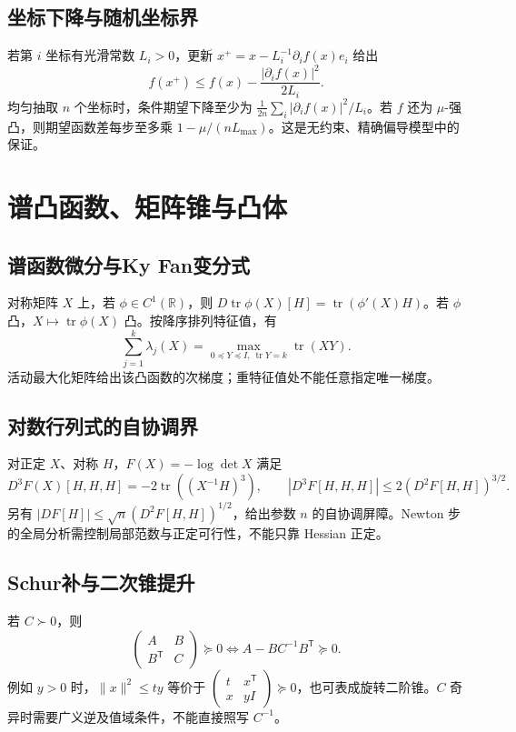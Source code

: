 \documentclass[../main.tex]{subfiles}
\begin{document}
\subsection{坐标下降与随机坐标界}
若第 $i$ 坐标有光滑常数 $L_i>0$，更新 $x^+=x-L_i^{-1}\partial_if(x)e_i$ 给出
\[
f(x^+)\le f(x)-\frac{|\partial_if(x)|^2}{2L_i}.
\]
均匀抽取 $n$ 个坐标时，条件期望下降至少为 $\frac1{2n}\sum_i|\partial_if(x)|^2/L_i$。若 $f$ 还为 $\mu$-强凸，则期望函数差每步至多乘 $1-\mu/(nL_{\max})$。这是无约束、精确偏导模型中的保证。
\section{谱凸函数、矩阵锥与凸体}
\subsection{谱函数微分与Ky Fan变分式}
对称矩阵 $X$ 上，若 $\phi\in C^1(\mathbb R)$，则 $D\operatorname{tr}\phi(X)[H]=\operatorname{tr}(\phi'(X)H)$。若 $\phi$ 凸，$X\mapsto\operatorname{tr}\phi(X)$ 凸。按降序排列特征值，有
\[
\sum_{j=1}^k\lambda_j(X)=\max_{0\preceq Y\preceq I,\ \operatorname{tr}Y=k}\operatorname{tr}(XY).
\]
活动最大化矩阵给出该凸函数的次梯度；重特征值处不能任意指定唯一梯度。
\subsection{对数行列式的自协调界}
对正定 $X$、对称 $H$，$F(X)=-\log\det X$ 满足
\[
D^3F(X)[H,H,H]=-2\operatorname{tr}((X^{-1}H)^3),\qquad
|D^3F[H,H,H]|\le2(D^2F[H,H])^{3/2}.
\]
另有 $|DF[H]|\le\sqrt n(D^2F[H,H])^{1/2}$，给出参数 $n$ 的自协调屏障。Newton 步的全局分析需控制局部范数与正定可行性，不能只靠 Hessian 正定。
\subsection{Schur补与二次锥提升}
若 $C\succ0$，则
\[
\begin{pmatrix}A&B\\B^{\mathsf T}&C\end{pmatrix}\succeq0
\iff A-BC^{-1}B^{\mathsf T}\succeq0.
\]
例如 $y>0$ 时，$\|x\|^2\le ty$ 等价于 $\begin{pmatrix}t&x^{\mathsf T}\\x&yI\end{pmatrix}\succeq0$，也可表成旋转二阶锥。$C$ 奇异时需要广义逆及值域条件，不能直接照写 $C^{-1}$。
\end{document}

